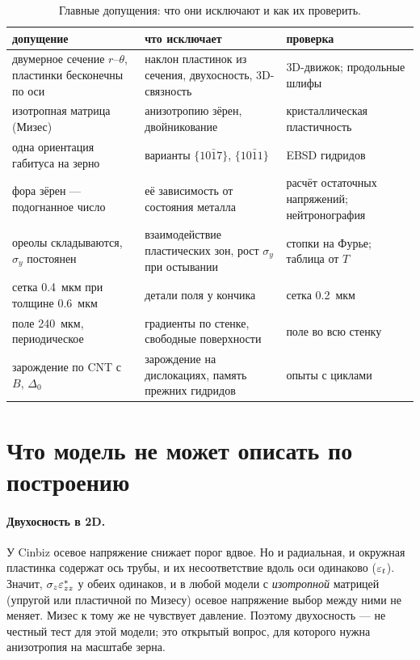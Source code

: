 \begin{table}[htbp]\centering\small
\caption{Главные допущения: что они исключают и как их проверить.}\label{tab:assump}
\begin{tabularx}{\linewidth}{>{\raggedright}p{3.6cm}>{\raggedright}X>{\raggedright\arraybackslash}p{4.2cm}}\toprule
допущение & что исключает & проверка\\\midrule
двумерное сечение $r$--$\theta$, пластинки бесконечны по оси & наклон пластинок из сечения, двухосность, 3D-связность & 3D-движок; продольные шлифы\\
изотропная матрица (Мизес) & анизотропию зёрен, двойникование & кристаллическая пластичность\\
одна ориентация габитуса на зерно & варианты $\{10\bar17\}$, $\{10\bar11\}$ & EBSD гидридов\\
фора зёрен --- подогнанное число & её зависимость от состояния металла & расчёт остаточных напряжений; нейтронография\\
ореолы складываются, $\sigma_y$ постоянен & взаимодействие пластических зон, рост $\sigma_y$ при остывании & стопки на Фурье; таблица от $T$\\
сетка 0.4~мкм при толщине 0.6~мкм & детали поля у кончика & сетка 0.2~мкм\\
поле 240~мкм, периодическое & градиенты по стенке, свободные поверхности & поле во всю стенку\\
зарождение по CNT с $B$, $\Delta_0$ & зарождение на дислокациях, память прежних гидридов & опыты с циклами\\
\bottomrule
\end{tabularx}
\end{table}

\section{Что модель не может описать по построению}

\paragraph{Двухосность в 2D.} У Cinbiz осевое напряжение снижает порог вдвое. Но и радиальная, и
окружная пластинка содержат ось трубы, и их несоответствие вдоль оси одинаково ($\varepsilon_t$). Значит,
$\sigma_z\varepsilon^*_{zz}$ у обеих одинаков, и в любой модели с \emph{изотропной} матрицей (упругой или
пластичной по Мизесу) осевое напряжение выбор между ними не меняет. Мизес к тому же не чувствует
давление. Поэтому двухосность --- не честный тест для этой модели; это открытый вопрос, для
которого нужна анизотропия на масштабе зерна.

